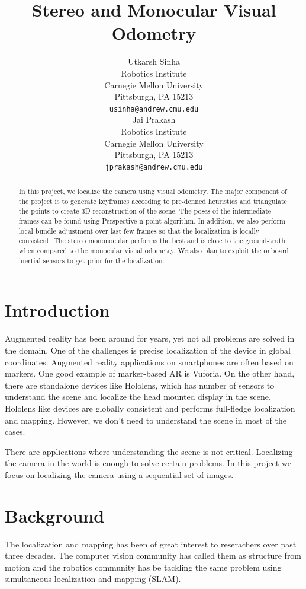\documentclass{article}
\title{Stereo and Monocular Visual Odometry}
\author{
 Utkarsh Sinha \\
  Robotics Institute\\
 Carnegie Mellon University \\
 Pittsburgh, PA 15213\\
  \texttt{usinha@andrew.cmu.edu} \\
\And
  Jai Prakash\\
  Robotics Institute\\
  Carnegie Mellon University\\
  Pittsburgh, PA 15213\\
  \texttt{jprakash@andrew.cmu.edu} \\
}
\begin{document}

\maketitle

\begin{abstract}
In this project, we localize the camera using visual odometry. The major component of the project is to generate keyframes according to pre-defined heuristics and triangulate the points to create 3D reconstruction of the scene. The poses of the intermediate frames can be found using Perspective-n-point algorithm. In addition, we also perform local bundle adjustment over last few frames so that the localization is locally consistent. The stereo mononocular performs the best and is close to the ground-truth when compared to the monocular visual odometry. We also plan to exploit the onboard inertial sensors to get prior for the localization.
\end{abstract}

\section{Introduction}

Augmented reality has been around for years, yet not all problems are solved in the domain. One of the challenges is precise localization of the device in global coordinates. Augmented reality applications on smartphones are often based on markers. One good example of marker-based AR is Vuforia. On the other hand, there are standalone devices like Hololens, which has number of sensors to understand the scene and localize the head mounted display in the scene. Hololens like devices are globally consistent and performs full-fledge localization and mapping. However, we don't need to understand the scene in most of the cases.

There are applications where understanding the scene is not critical. Localizing the camera in the world is enough to solve certain problems. In this project we focus on localizing the camera using a sequential set of images.


\section{Background}
The localization and mapping has been of great interest to reserachers over past three decades. The computer vision community has called them as structure from motion and the robotics community has be tackling the same problem using simultaneous localization and mapping (SLAM).
\end{document}
